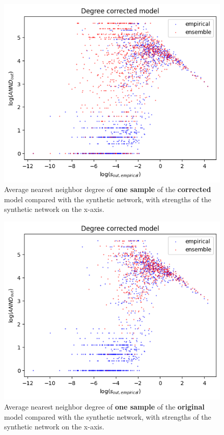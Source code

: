 \documentclass{article}
\begin{document}
\begin{figure}[!ht]
    \centering
    \includegraphics[scale=0.5]{img/metropolis/corrected model/annd_vs_s_sample.png}
    \caption{Average nearest neighbor degree of \textbf{one sample} of the \textbf{corrected} model compared with the synthetic network, with strengths of the synthetic network on the x-axis.}
\end{figure}\begin{figure}[!ht]
    \centering
    \includegraphics[scale=0.5]{img/metropolis/vanilla model/annd_vs_s_sample.png}
    \caption{Average nearest neighbor degree of \textbf{one sample} of the \textbf{original} model compared with the synthetic network, with strengths of the synthetic network on the x-axis.}
\end{figure}
\end{document}
